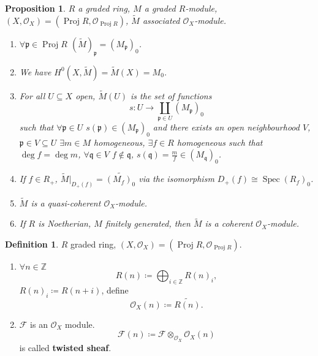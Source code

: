 \documentclass[12pt]{article}
\DeclareMathOperator{\Spec}{Spec}
\DeclareMathOperator{\Proj}{Proj}
\newtheorem*{proposition}{Proposition}
\theoremstyle{definition}
\newtheorem*{definition}{Definition}
\theoremstyle{remark}
\begin{document}
\begin{proposition}
$R$ a graded ring, $M$ a graded $R$-module, $(X,\mathcal{O}_X)=(\Proj R,\mathcal{O}_{\Proj R})$, $\widetilde{M}$ associated $\mathcal{O}_X$-module.

\begin{enumerate}[label=\arabic*)]
\item $\forall\mathfrak{p}\in\Proj R$ $(\widetilde{M})_{\mathfrak{p}}=(M_{\mathfrak{p}})_0$.

\item We have $H^0(X,\widetilde{M})=\widetilde{M}(X)=M_0$.

\item For all $U\subseteq X$ open, $\widetilde{M}(U)$ is the set of functions
\[s:U\rightarrow\coprod_{\mathfrak{p}\in U}(M_{\mathfrak{p}})_0\]
such that $\forall\mathfrak{p}\in U$ $s(\mathfrak{p})\in(M_{\mathfrak{p}})_0$ and there exists an open neighbourhood $V$, $\mathfrak{p}\in V\subseteq U$ $\exists m\in M$ homogeneous, $\exists f\in R$ homogeneous such that $\deg f=\deg m$, $\forall\mathfrak{q}\in V$ $f\notin\mathfrak{q}$, $s(\mathfrak{q})=\frac{m}{f}\in(M_{\mathfrak{q}})_0$.

\item If $f\in R_+$, $\widetilde{M}|_{D_+(f)}=\widetilde{(M_f)_0}$ via the isomorphism $D_+(f)\cong\Spec(R_f)_0$.

\item $\widetilde{M}$ is a quasi-coherent $\mathcal{O}_X$-module.

\item If $R$ is Noetherian, $M$ finitely generated, then $\widetilde{M}$ is a coherent $\mathcal{O}_X$-module.
\end{enumerate}
\end{proposition}

\begin{definition}
$R$ graded ring, $(X,\mathcal{O}_X)=(\Proj R,\mathcal{O}_{\Proj R})$.

\begin{enumerate}[label=\arabic*)]
\item $\forall n\in\mathbb{Z}$
\[R(n)\coloneqq\bigoplus_{i\in\mathbb{Z}}R(n)_i,\]
$R(n)_i\coloneqq R(n+i)$, define
\[\mathcal{O}_X(n)\coloneqq\widetilde{R(n)}.\]

\item $\mathcal{F}$ is an $\mathcal{O}_X$ module.
\[\mathcal{F}(n)\coloneqq\mathcal{F}\otimes_{\mathcal{O}_X}\mathcal{O}_X(n)\]
is called \textbf{twisted sheaf}.
\end{enumerate}
\end{definition}
\end{document}
